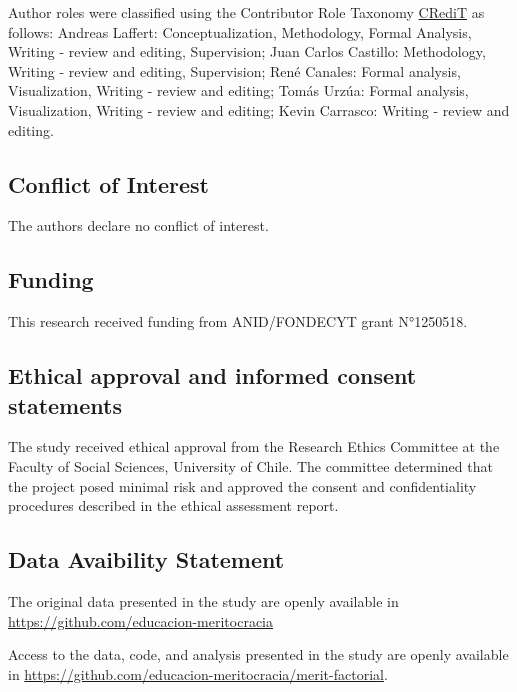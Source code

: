 \documentclass[
  12pt,
  letterpaper,
  DIV=11,
  numbers=noendperiod]{scrartcl}
\begin{document}
Author roles were classified using the Contributor Role Taxonomy
\href{https://credit.niso.org/}{CRediT} as follows: Andreas Laffert:
Conceptualization, Methodology, Formal Analysis, Writing - review and
editing, Supervision; Juan Carlos Castillo: Methodology, Writing -
review and editing, Supervision; René Canales: Formal analysis,
Visualization, Writing - review and editing; Tomás Urzúa: Formal
analysis, Visualization, Writing - review and editing; Kevin Carrasco:
Writing - review and editing.

\subsection{Conflict of Interest}\label{conflict-of-interest}

The authors declare no conflict of interest.

\subsection{Funding}\label{funding}

This research received funding from ANID/FONDECYT grant N°1250518.

\subsection{Ethical approval and informed consent
statements}\label{ethical-approval-and-informed-consent-statements}

The study received ethical approval from the Research Ethics Committee
at the Faculty of Social Sciences, University of Chile. The committee
determined that the project posed minimal risk and approved the consent
and confidentiality procedures described in the ethical assessment
report.

\subsection{Data Avaibility Statement}\label{data-avaibility-statement}

The original data presented in the study are openly available in
\url{https://github.com/educacion-meritocracia}

Access to the data, code, and analysis presented in the study are openly
available in
\url{https://github.com/educacion-meritocracia/merit-factorial}.
\end{document}
